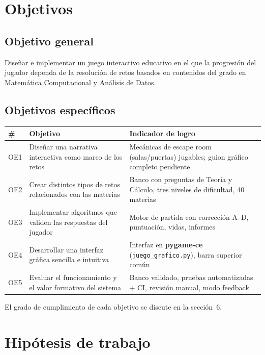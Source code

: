 \documentclass[11pt,a4paper]{article}
\newcommand{\bloquetfg}[1]{\par\smallskip\noindent #1\par}
\begin{document}
\section{Objetivos}

\subsection{Objetivo general}

Diseñar e implementar un juego interactivo educativo en el que la progresión del jugador dependa de la resolución de retos basados en contenidos del grado en Matemática Computacional y Análisis de Datos.

\subsection{Objetivos específicos}

{\small\setlength{\tabcolsep}{4pt}%
\begin{tabular}{@{}l>{\raggedright\arraybackslash}p{3.4cm}>{\raggedright\arraybackslash}p{7.8cm}@{}}
\toprule
\textbf{\#} & \textbf{Objetivo} & \textbf{Indicador de logro} \\
\midrule
OE1 & Diseñar una narrativa interactiva como marco de los retos & Mecánicas de escape room (salas/puertas) jugables; guion gráfico completo pendiente \\
OE2 & Crear distintos tipos de retos relacionados con las materias & Banco con preguntas de Teoría y Cálculo, tres niveles de dificultad, 40 materias \\
OE3 & Implementar algoritmos que validen las respuestas del jugador & Motor de partida con corrección A--D, puntuación, vidas, informes \\
OE4 & Desarrollar una interfaz gráfica sencilla e intuitiva & Interfaz en \textbf{pygame-ce} (\texttt{juego\_grafico.py}), barra superior común \\
OE5 & Evaluar el funcionamiento y el valor formativo del sistema & Banco validado, pruebas automatizadas + CI, revisión manual, modo feedback \\
\bottomrule
\end{tabular}}

\bloquetfg{El grado de cumplimiento de cada objetivo se discute en la sección~6.}

\section{Hipótesis de trabajo}
\end{document}
